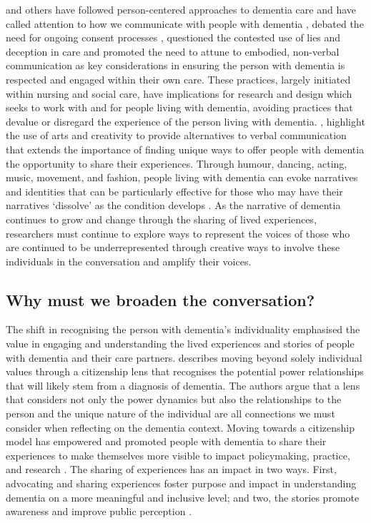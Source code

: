 \cite{kitwood1997dementia} and others have followed person-centered approaches to dementia care and have called attention to how we communicate with people with dementia \citep{oyebode_mental_2005}, debated the need for ongoing consent processes \citep{dewing_participatory_2007}, questioned the contested use of lies and deception in care \citep{elvish_lying_2010} and promoted the need to attune to embodied, non-verbal communication \citep{group_patron_2019,twigg_dress_2013} as key considerations in ensuring the person with dementia is respected and engaged within their own care. These practices, largely initiated within nursing and social care, have implications for research and design which seeks to work with and for people living with dementia, avoiding practices that devalue or disregard the experience of the person living with dementia. \cite{john_killick_claire_craig_creativity_2012}, highlight the use of arts and creativity to provide alternatives to verbal communication that extends the importance of finding unique ways to offer people with dementia the opportunity to share their experiences. Through humour, dancing, acting, music, movement, and fashion, people living with dementia can evoke narratives and identities that can be particularly effective for those who may have their narratives `dissolve' as the condition develops \citep{villar_giving_2019}. As the narrative of dementia continues to grow and change through the sharing of lived experiences, researchers must continue to explore ways to represent the voices of those who are continued to be underrepresented through creative ways to involve these individuals in the conversation and amplify their voices.

\subsection{Why must we broaden the conversation?}
\label{Design-conversation}
The shift in recognising the person with dementia's individuality emphasised the value in engaging and understanding the lived experiences and stories of people with dementia and their care partners. \cite{bartlett_personhood_2007} describes moving beyond solely individual values through a citizenship lens that recognises the potential power relationships that will likely stem from a diagnosis of dementia. The authors argue that a lens that considers not only the power dynamics but also the relationships to the person and the unique nature of the individual are all connections we must consider when reflecting on the dementia context. Moving towards a citizenship model has empowered and promoted people with dementia to share their experiences to make themselves more visible to impact policymaking, practice, and research \citep{weetch_involvement_2020}. The sharing of experiences has an impact in two ways. First, advocating and sharing experiences foster purpose and impact in understanding dementia on a more meaningful and inclusive level; and two, the stories promote awareness and improve public perception \citep{reynolds2017stigma}. 

